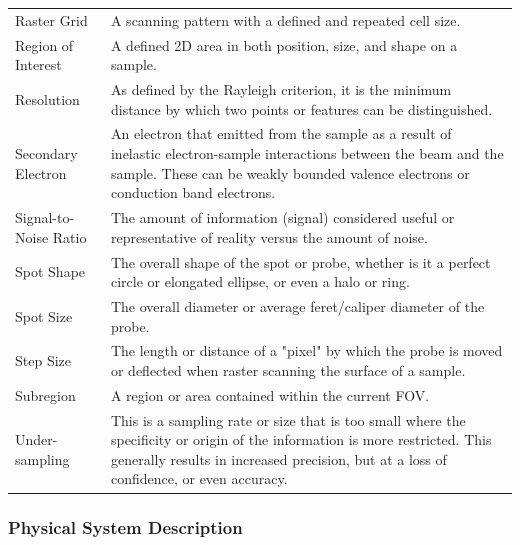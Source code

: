 \documentclass[12pt]{article}
\begin{document}
\begin{center}
\begin{longtable}{p{4.25cm} p{11.25cm}}
        Raster Grid & A scanning pattern with a defined and repeated cell size. \\
        
        Region of Interest & A defined 2D area in both position, size, and shape on a sample. \\
        
        Resolution & As defined by the Rayleigh criterion, it is the minimum distance by which two points or features can be distinguished. \\
        
        Secondary Electron & An electron that emitted from the sample as a result of inelastic electron-sample interactions between the beam and the sample. These can be weakly bounded valence electrons or conduction band electrons. \\
        
        Signal-to-Noise Ratio & The amount of information (signal) considered useful or representative of reality versus the amount of noise. \\
        
        Spot Shape & The overall shape of the spot or probe, whether is it a perfect circle or elongated ellipse, or even a halo or ring. \\
        
        Spot Size & The overall diameter or average feret/caliper diameter of the probe. \\
        
        Step Size & The length or distance of a "pixel" by which the probe is moved or deflected when raster scanning the surface of a sample. \\
        
        Subregion & A region or area contained within the current FOV. \\

        Under-sampling & This is a sampling rate or size that is too small where the specificity or origin of the information is more restricted. This generally results in increased precision, but at a loss of confidence, or even accuracy. \\
        \bottomrule
    \end{longtable} 
\end{center}

\newpage

\subsubsection{Physical System Description} \label{sec_phySystDescrip}
\end{document}
